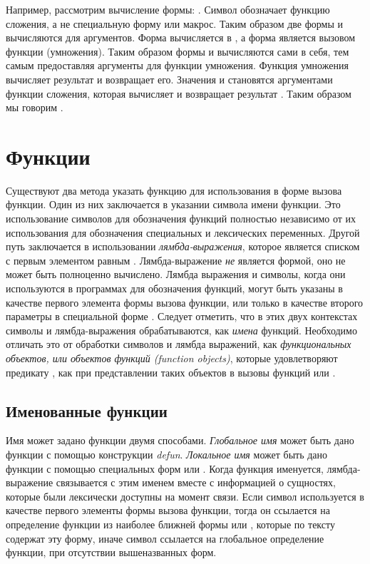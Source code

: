 Например, рассмотрим вычисление формы: .
Символ \cdf{+} обозначает функцию сложения, а не специальную форму или макрос.
Таким образом две формы  и  вычисляются для аргументов. Форма
 вычисляется в , а форма  является вызовом функции
(умножения). Таким образом формы  и  вычисляются сами в себя, тем
самым предоставляя аргументы для функции умножения. Функция умножения вычисляет
результат  и возвращает его. Значения  и  становятся
аргументами функции сложения, которая вычисляет и возвращает результат
. Таким образом мы говорим .

\section{Функции}

Существуют два метода указать функцию для использования в форме вызова
функции. Один из них заключается в указании символа имени функции. Это
использование символов для обозначения функций полностью независимо от их
использования для обозначения специальных и лексических переменных. Другой путь
заключается в использовании \emph{лямбда-выражения}, которое является списком
с первым элементом равным . Лямбда-выражение \emph{не} является
формой, оно не может быть полноценно вычислено. Лямбда выражения и символы,
когда они используются в программах для обозначения функций, могут быть
указаны в качестве первого элемента формы вызова функции, или только в качестве
второго параметры в специальной форме . Следует отметить, что
в этих двух контекстах символы и лямбда-выражения обрабатываются, как
\emph{имена} функций. Необходимо отличать это от обработки символов и лямбда
выражений, как \emph{функциональных объектов, или объектов функций (function
  objects)}, которые удовлетворяют предикату , как при
представлении таких объектов в вызовы функций  или . 

\subsection{Именованные функции}

Имя может задано функции двумя способами.
\emph{Глобальное имя} может быть дано функции с помощью конструкции
\emph{defun}.
\emph{Локальное имя} может быть дано функции с помощью специальных форм
 или .
Когда функция именуется, лямбда-выражение связывается с этим именем вместе с
информацией о сущностях, которые были лексически доступны на момент связи.
Если символ используется в качестве первого элементы формы вызова функции, тогда
он ссылается на определение функции из наиболее ближней формы  или
, которые по тексту содержат эту форму, иначе символ ссылается на
глобальное определение функции, при отсутствии вышеназванных форм.

